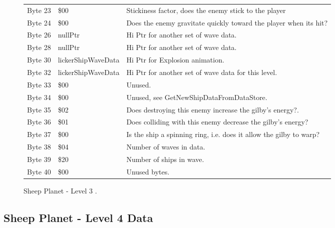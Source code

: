 \begin{figure}[H]
{\begin{adjustbox}{width=12cm}
\begin{tabular}{lll}
 Byte 23 & \$00                       & Stickiness factor, does the enemy stick to the player              \\
 Byte 24 & \$00                       & Does the enemy gravitate quickly toward the player when its hit?   \\
 Byte 26 & nullPtr                   & Hi Ptr for another set of wave data.                               \\
 Byte 28 & nullPtr                   & Hi Ptr for another set of wave data.                               \\
 Byte 30 & lickerShipWaveData        & Hi Ptr for Explosion animation.                                    \\
 Byte 32 & lickerShipWaveData        & Hi Ptr for another set of wave data for this level.                \\
 Byte 33 & \$00                       & Unused.                                                            \\
 Byte 34 & \$00                       & Unused, see GetNewShipDataFromDataStore.                           \\
 Byte 35 & \$02                       & Does destroying this enemy increase the gilby's energy?.           \\
 Byte 36 & \$01                       & Does colliding with this enemy decrease the gilby's energy?        \\
 Byte 37 & \$00                       & Is the ship a spinning ring, i.e. does it allow the gilby to warp? \\
 Byte 38 & \$04                       & Number of waves in data.                                           \\
 Byte 39 & \$20                       & Number of ships in wave.                                           \\
 Byte 40 & \$00                       & Unused bytes.                                                      \\
\bottomrule
\end{tabular}

  \end{adjustbox}

  }\caption*{Sheep Planet - Level 3
.}
\end{figure}

\clearpage
\subsection{Sheep Planet - Level 4 Data}


